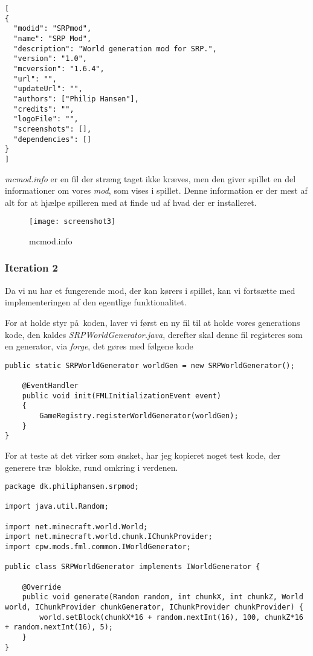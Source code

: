 \documentclass[a4paper,12pt]{report}
\begin{document}
\begin{lstlisting}[label=mcmod.info,caption=mcmod.info]
[
{
  "modid": "SRPmod",
  "name": "SRP Mod",
  "description": "World generation mod for SRP.",
  "version": "1.0",
  "mcversion": "1.6.4",
  "url": "",
  "updateUrl": "",
  "authors": ["Philip Hansen"],
  "credits": "",
  "logoFile": "",
  "screenshots": [],
  "dependencies": []
}
]
\end{lstlisting}
			\emph{mcmod.info} er en fil der str\ae ng taget ikke kr\ae ves, men den giver spillet en del informationer om vores \emph{mod}, som vises i spillet.
			Denne information er der mest af alt for at hj\ae lpe spilleren med at finde ud af hvad der er installeret.

			\begin{wrapfigure}{r}{0.5\textwidth}
				\texttt{[image: screenshot3]}
				\caption{mcmod.info}
			\end{wrapfigure}
		\subsubsection{Iteration 2}
			Da vi nu har et fungerende mod, der kan k\o rers i spillet, kan vi forts\ae tte med implementeringen af den egentlige funktionalitet.

			For at holde styr p\aa \ koden, laver vi f\o rst en ny fil til at holde vores generations kode, den kaldes \emph{SRPWorldGenerator.java},
			derefter skal denne fil registeres som en generator, via \emph{forge}, det g\o res med f\o lgene kode

\begin{lstlisting}[label=SRPMod2,caption=SRPMod.java]
    public static SRPWorldGenerator worldGen = new SRPWorldGenerator();
    
    @EventHandler
    public void init(FMLInitializationEvent event)
    {
        GameRegistry.registerWorldGenerator(worldGen);
    }
}
\end{lstlisting}
	
			For at teste at det virker som \o nsket, har jeg kopieret noget test kode, der generere tr\ae \ blokke,
			rund omkring i verdenen.

\begin{lstlisting}[label=SRPWorldGenerator,caption=SRPWorldGenerator.java]
package dk.philiphansen.srpmod;

import java.util.Random;

import net.minecraft.world.World;
import net.minecraft.world.chunk.IChunkProvider;
import cpw.mods.fml.common.IWorldGenerator;

public class SRPWorldGenerator implements IWorldGenerator {

    @Override
    public void generate(Random random, int chunkX, int chunkZ, World world, IChunkProvider chunkGenerator, IChunkProvider chunkProvider) {
        world.setBlock(chunkX*16 + random.nextInt(16), 100, chunkZ*16 + random.nextInt(16), 5);
    }
}
\end{lstlisting}
\end{document}
